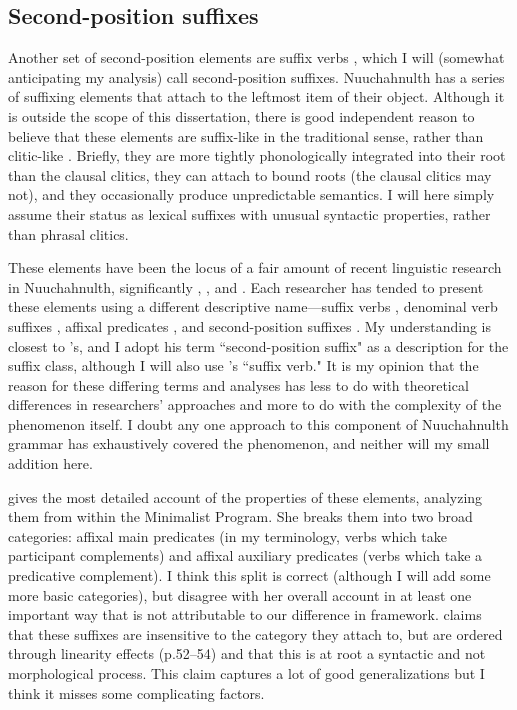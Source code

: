 \subsection{Second-position suffixes} \label{ch:clause:2pv}

Another set of second-position elements are suffix verbs \citep{kammler96-14}, which I will (somewhat anticipating my analysis) call second-position suffixes. Nuuchahnulth has a series of suffixing elements that attach to the leftmost item of their object. Although it is outside the scope of this dissertation, there is good independent reason to believe that these elements are suffix-like in the traditional sense, rather than clitic-like \citep{werle2007b}. Briefly, they are more tightly phonologically integrated into their root than the clausal clitics, they can attach to bound roots (the clausal clitics may not), and they occasionally produce unpredictable semantics. I will here simply assume their status as lexical suffixes with unusual syntactic properties, rather than phrasal clitics.

These elements have been the locus of a fair amount of recent linguistic research in Nuuchahnulth, significantly \citet{waldie2004}, \citet{wojdak2005}, and \citet{woo2007b}. Each researcher has tended to present these elements using a different descriptive name---suffix verbs \citep{kammler96-14}, denominal verb suffixes \citep{waldie2004}, affixal predicates \citep{wojdak2005}, and second-position suffixes \citep{werle2007b}. My understanding is closest to \citeauthor{werle2007b}'s, and I adopt his term ``second-position suffix" as a description for the suffix class, although I will also use \citeauthor{kammler96-14}'s ``suffix verb." It is my opinion that the reason for these differing terms and analyses has less to do with theoretical differences in researchers' approaches and more to do with the complexity of the phenomenon itself. I doubt any one approach to this component of Nuuchahnulth grammar has exhaustively covered the phenomenon, and neither will my small addition here.

\citet{wojdak2005, wojdak2007} gives the most detailed account of the properties of these elements, analyzing them from within the Minimalist Program. She breaks them into two broad categories: affixal main predicates (in my terminology, verbs which take participant complements) and affixal auxiliary predicates (verbs which take a predicative complement). I think this split is correct (although I will add some more basic categories), but disagree with her overall account in at least one important way that is not attributable to our difference in framework. \citeauthor{wojdak2005} claims that these suffixes are insensitive to the category they attach to, but are ordered through linearity effects (p.52--54) and that this is at root a syntactic and not morphological process. This claim captures a lot of good generalizations but I think it misses some complicating factors.

